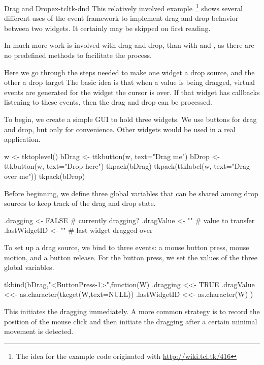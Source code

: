 \begin{example}{Drag and Drop}{ex-tcltk-dnd}
This relatively involved example~\footnote{The idea for the example
  code originated with \url{http://wiki.tcl.tk/416}} shows several
different uses of the event framework to implement drag and drop
behavior between two widgets. It certainly may be skipped on first reading.


In  much more work is involved with drag and drop, than
with  and , as there are no predefined methods
to facilitate the process. 

Here we go through the steps needed to make one widget a drop source,
and the other a drop target The basic idea is that when a value is
being dragged, virtual events are generated for the widget the cursor
is over. If that widget has callbacks listening to these events, then the
drag and drop can be processed.


To begin, we create a simple GUI to hold three widgets. We use buttons
for drag and drop, but only for convenience. Other widgets would be
used in a real application.
\begin{Schunk}
\begin{Sinput}
 w <- tktoplevel()
 bDrag <- ttkbutton(w, text="Drag me")
 bDrop <- ttkbutton(w, text="Drop here")
 tkpack(bDrag)
 tkpack(ttklabel(w, text="Drag over me"))
 tkpack(bDrop)
\end{Sinput}
\end{Schunk}
%

Before beginning, we define three global variables that can be shared
among drop sources to keep track of the drag and drop state. 
\begin{Schunk}
\begin{Sinput}
 .dragging <- FALSE                 # currently dragging?
 .dragValue <- ""                   # value to transfer
 .lastWidgetID <- ""                # last widget dragged over
\end{Sinput}
\end{Schunk}
%
%
To set up a drag source, we bind to three events: a mouse button
press, mouse motion, and a button release. For the button press, we
set the values of the three global variables.
\begin{Schunk}
\begin{Sinput}
 tkbind(bDrag,"<ButtonPress-1>",function(W) {
   .dragging <<-  TRUE
   .dragValue <<- as.character(tkcget(W,text=NULL))
   .lastWidgetID <<- as.character(W)
 })
\end{Sinput}
\end{Schunk}
%
This initiates the dragging immediately. A more common strategy is to
record the position of the mouse click and then initiate the dragging
after a certain minimal movement is detected.


\end{example}

